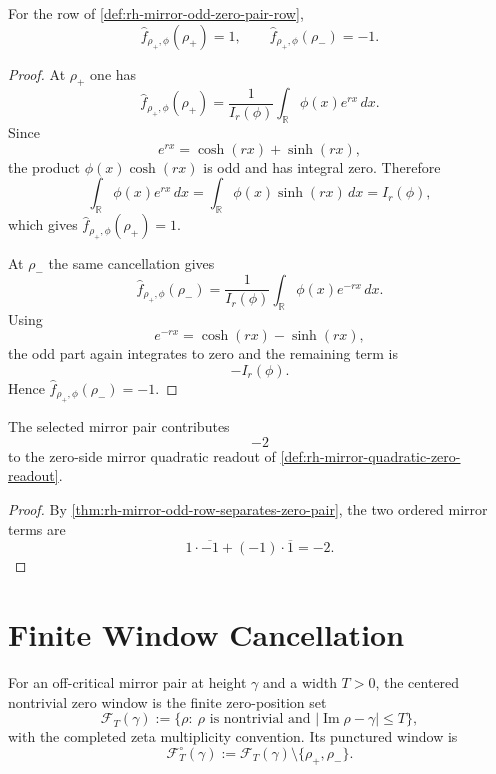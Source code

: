 \begin{theorem}
\label{thm:rh-mirror-odd-row-separates-zero-pair}
For the row of \autoref{def:rh-mirror-odd-zero-pair-row},
$$
\widehat f_{\rho_+,\phi}(\rho_+)=1,
\qquad
\widehat f_{\rho_+,\phi}(\rho_-)=-1.
$$
\end{theorem}

\begin{proof}
At $\rho_+$ one has
$$
\widehat f_{\rho_+,\phi}(\rho_+)
=
\frac1{I_r(\phi)}
\int_{\mathbb R}\phi(x)e^{rx}\,dx.
$$
Since
$$
e^{rx}=\cosh(rx)+\sinh(rx),
$$
the product $\phi(x)\cosh(rx)$ is odd and has integral zero.  Therefore
$$
\int_{\mathbb R}\phi(x)e^{rx}\,dx
=
\int_{\mathbb R}\phi(x)\sinh(rx)\,dx
=
I_r(\phi),
$$
which gives $\widehat f_{\rho_+,\phi}(\rho_+)=1$.

At $\rho_-$ the same cancellation gives
$$
\widehat f_{\rho_+,\phi}(\rho_-)
=
\frac1{I_r(\phi)}
\int_{\mathbb R}\phi(x)e^{-rx}\,dx.
$$
Using
$$
e^{-rx}=\cosh(rx)-\sinh(rx),
$$
the odd part again integrates to zero and the remaining term is
$$
-I_r(\phi).
$$
Hence $\widehat f_{\rho_+,\phi}(\rho_-)=-1$.
\end{proof}

\begin{corollary}
\label{cor:rh-mirror-odd-row-local-negative-block}
The selected mirror pair contributes
$$
-2
$$
to the zero-side mirror quadratic readout of
\autoref{def:rh-mirror-quadratic-zero-readout}.
\end{corollary}

\begin{proof}
By \autoref{thm:rh-mirror-odd-row-separates-zero-pair}, the two ordered
mirror terms are
$$
1\cdot\overline{-1}+(-1)\cdot\overline{1}
=
-2.
$$
\end{proof}

\section{Finite Window Cancellation}
\label{sec:rh-pw-zero-pair-finite-window-cancellation}

\begin{definition}
\label{def:rh-centered-zero-window}
For an off-critical mirror pair at height $\gamma$ and a width
$T>0$, the centered nontrivial zero window is the finite zero-position
set
$$
\mathcal F_T(\gamma)
:=
\{\rho:\ \rho\text{ is nontrivial and }|\operatorname{Im}\rho-\gamma|\le T\},
$$
with the completed zeta multiplicity convention.  Its punctured window
is
$$
\mathcal F_T^\circ(\gamma)
:=
\mathcal F_T(\gamma)\setminus\{\rho_+,\rho_-\}.
$$
\end{definition}

